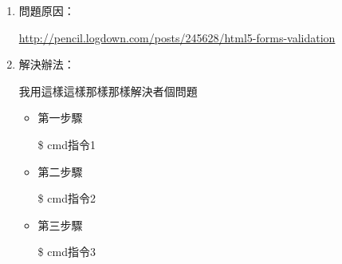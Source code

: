 

\begin{enumerate}
	\item 問題原因：
	
	\url{http://pencil.logdown.com/posts/245628/html5-forms-validation}
	
	
	\item 解決辦法：
	
	我用這樣這樣那樣那樣解決者個問題
	\begin{itemize}
		\item 第一步驟
		
		\colorbox{mygray}{\$ cmd指令1}
		
		\item 第二步驟
		
		\colorbox{mygray}{\$ cmd指令2}
		
		\item 第三步驟
		
		\colorbox{mygray}{\$ cmd指令3}
		
	\end{itemize}
\end{enumerate}











